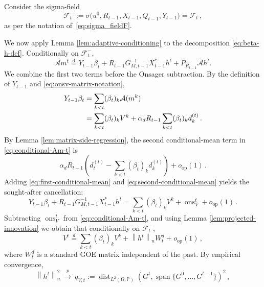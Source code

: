 \documentclass[11pt]{article}
\theoremstyle{definition}
\theoremstyle{remark}
\numberwithin{equation}{section}
\numberwithin{theorem}{section}
\newcommand{\Prob}{\mathbb P}
\newcommand{\Span}{\operatorname{span}}
\newcommand{\op}{\mathrm{op}}
\newcommand{\dist}{\operatorname{dist}}
\newcommand{\norm}[1]{\left\lVert #1\right\rVert}
\newcommand{\cA}{\mathcal A}
\newcommand{\ons}{\operatorname{ons}}
\newcommand{\xto}{\xrightarrow}
\begin{document}
Consider the sigma-field 
\begin{equation}\label{eq:past-minus}
  \mathcal F_t^-:= \sigma\bigl(u^0,R_{t-1},X_{t-1},Q_{t-1},Y_{t-1}\bigr) = \mathscr F_{t}\,,
\end{equation}
as per the notation of~\eqref{eq:sigma_fieldF}.

We now apply Lemma \ref{lem:adaptive-conditioning} to the decomposition \eqref{eq:beta-h-def}.  Conditionally on $\mathcal F_t^-$,
\begin{equation}\label{eq:conditional-Am-t}
  \cA m^t
  \overset{\mathrm d}{=}
  Y_{t-1}\beta_t
  +R_{t-1}G_{M,t-1}^{-1}X_{t-1}^*h^t
  +P_{R_{t-1}}^\perp\widetilde{\cA} h^t.
\end{equation}
We combine the first two terms before the Onsager subtraction.  By the definition of $Y_{t-1}$ and \eqref{eq:onsv-matrix-notation},
\begin{align}
  Y_{t-1}\beta_t
  &=\sum_{k<t}(\beta_t)_k\cA (m^k) \notag\\
  &=\sum_{k<t}(\beta_t)_kV^k
    +\alpha_dR_{t-1}\sum_{k<t}(\beta_t)_k d_k^{(t)}\,.
  \label{eq:first-conditional-mean}
\end{align}
By Lemma \ref{lem:matrix-side-regression}, the second conditional-mean term in \eqref{eq:conditional-Am-t} is
\begin{equation}\label{eq:second-conditional-mean}
  \alpha_dR_{t-1}
  \left(d_t^{(t)}-\sum_{k<t}(\beta_t)_kd_k^{(t)}\right)
  +o_{\op}(1)\,.
\end{equation}
Adding \eqref{eq:first-conditional-mean} and \eqref{eq:second-conditional-mean} yields the sought-after cancellation:
\begin{equation}\label{eq:combined-conditional-mean-matrix}
  Y_{t-1}\beta_t
  +R_{t-1}G_{M,t-1}^{-1}X_{t-1}^*h^t
  =\sum_{k<t}(\beta_t)_kV^k
   +\ons_V^t+o_{\op}(1)\,.
\end{equation}
%
Subtracting $\ons_V^t$ from \eqref{eq:conditional-Am-t}, and using Lemma \ref{lem:projected-innovation} we obtain that conditionally on $\mathcal F_t^-$,
\begin{equation}\label{eq:matrix-innovation-decomposition}
  V^t
  \stackrel{d}{=}\sum_{k<t}(\beta_t)_kV^k
   +\norm{h^t}_nW_t^d
   +o_{\op}(1)\,,
\end{equation}
where $W_t^d$ is a standard GOE matrix independent of the past.  By empirical convergence,
\begin{equation}\label{eq:h-var-limit-detailed}
  \norm{h^t}_n^2 ~\xto{p} ~
  q_{V,t} := 
  \dist_{L^2(\Omega,\Prob)}\left(G^t,\Span\{G^0,\ldots,G^{t-1}\}\right)^2\,,
\end{equation}
\end{document}
